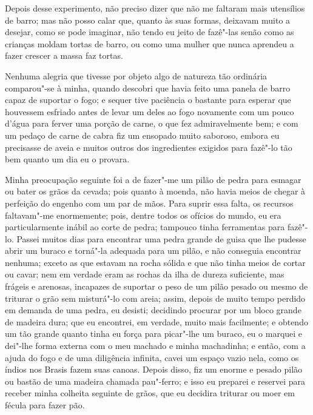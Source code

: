 Depois desse experimento, não preciso dizer que não me faltaram mais
utensílios de barro; mas não posso calar que, quanto às suas formas,
deixavam muito a desejar, como se pode imaginar, não tendo eu jeito de
fazê"-las senão como as crianças moldam tortas de barro, ou como uma
mulher que nunca aprendeu a fazer crescer a massa faz tortas.

Nenhuma alegria que tivesse por objeto algo de natureza tão ordinária
comparou"-se à minha, quando descobri que havia feito uma panela de barro
capaz de suportar o fogo; e sequer tive paciência o bastante para
esperar que houvessem esfriado antes de levar um deles ao fogo novamente
com um pouco d'água para ferver uma porção de carne, o que fez
admiravelmente bem; e com um pedaço de carne de cabra fiz um ensopado
muito saboroso, embora eu precisasse de aveia e muitos outros dos
ingredientes exigidos para fazê"-lo tão bem quanto um dia eu o provara.

Minha preocupação seguinte foi a de fazer"-me um pilão de pedra para
esmagar ou bater os grãos da cevada; pois quanto à moenda, não havia
meios de chegar à perfeição do engenho com um par de mãos. Para suprir
essa falta, os recursos faltavam"-me enormemente; pois, dentre todos os
ofícios do mundo, eu era particularmente inábil ao corte de pedra;
tampouco tinha ferramentas para fazê"-lo. Passei muitos dias para
encontrar uma pedra grande de guisa que lhe pudesse abrir um buraco e
torná"-la adequada para um pilão, e não conseguia encontrar nenhuma;
exceto as que estavam na rocha sólida e que não tinha meios de cortar ou
cavar; nem em verdade eram as rochas da ilha de dureza suficiente, mas
frágeis e arenosas, incapazes de suportar o peso de um pilão pesado ou
mesmo de triturar o grão sem misturá"-lo com areia; assim, depois de
muito tempo perdido em demanda de uma pedra, eu desisti; decidindo
procurar por um bloco grande de madeira dura; que eu encontrei, em
verdade, muito mais facilmente; e obtendo um tão grande quanto tinha eu
força para picar"-lhe um buraco, eu o marquei e dei"-lhe forma externa com
o meu machado e minha machadinha; e então, com a ajuda do fogo e de uma
diligência infinita, cavei um espaço vazio nela, como os índios nos
Brasis fazem suas canoas. Depois disso, fiz um enorme e pesado pilão ou
bastão de uma madeira chamada pau"-ferro; e isso eu preparei e reservei
para receber minha colheita seguinte de grãos, que eu decidira triturar
ou moer em fécula para fazer pão.

